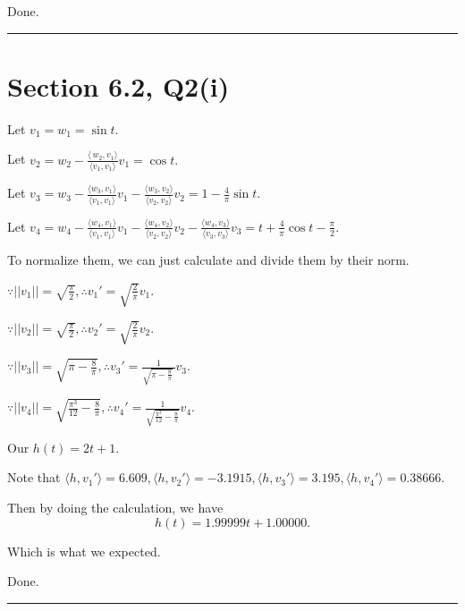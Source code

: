 \documentclass[12pt]{article}%
\begin{document}
Done.

\noindent\rule[0.1ex]{\linewidth}{1pt}

\section{Section 6.2, Q2(i)}
Let $v_1=w_1=\sin{t}$.

Let $v_2=w_2-\frac{\langle\, w_2,v_1 \rangle}{\langle v_1,v_1\rangle}v_1=\cos{t}.$

Let $v_3=w_3-\frac{\langle w_3,v_1 \rangle}{\langle v_1,v_1 \rangle}v_1-\frac{\langle w_3,v_2 \rangle}{\langle v_2,v_2 \rangle}v_2=1-\frac{4}{\pi}\sin{t}.$

Let $v_4=w_4-\frac{\langle w_4,v_1 \rangle}{\langle v_1,v_1 \rangle}v_1-\frac{\langle w_4,v_2 \rangle}{\langle v_2,v_2 \rangle}v_2-\frac{\langle w_4,v_3 \rangle}{\langle v_3,v_3\rangle}v_3=t+\frac{4}{\pi}\cos{t}-\frac{\pi}{2}.$

To normalize them, we can just calculate and divide them by their norm.

$\because ||v_1||=\sqrt{\frac{\pi}{2}}, \therefore v_1'=\sqrt{\frac{2}{\pi}}v_1.$

$\because ||v_2||=\sqrt{\frac{\pi}{2}}, \therefore v_2'=\sqrt{\frac{2}{\pi}}v_2.$

$\because ||v_3||=\sqrt{\pi-\frac{8}{\pi}}, \therefore v_3'=\frac{1}{\sqrt{\pi-\frac{8}{\pi}}~}v_3.$

$\because ||v_4||=\sqrt{\frac{\pi^3}{12}-\frac{8}{\pi}}, \therefore v_4'=\frac{1}{\sqrt{ \frac{\pi^3}{12}-\frac{8}{\pi}} }v_4.$

Our $h(t)=2t+1.$

Note that $\langle h, v_1'\rangle =6.609, \langle h, v_2'\rangle =-3.1915, \langle h, v_3'\rangle =3.195, \langle h, v_4'\rangle =0.38666.$

Then by doing the calculation, we have $$h(t)=1.99999t+1.00000.$$

Which is what we expected.

Done.

\noindent\rule[0.1ex]{\linewidth}{1pt}
\end{document}
